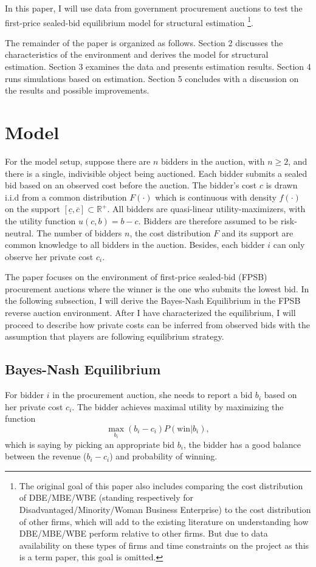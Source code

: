 \documentclass[11pt]{article}
\begin{document}
In this paper, I will use data from government procurement auctions to test 
the first-price sealed-bid equilibrium model \cite{RileySamuelson1981} 
for structural estimation
\footnote{The original goal of this paper also includes comparing the cost 
distribution of DBE/MBE/WBE (standing respectively for Disadvantaged/Minority/Woman
Business Enterprise) to the cost distribution of other firms, which will add 
to the existing literature on understanding how DBE/MBE/WBE perform relative 
to other firms. But due to data availability on these types of firms 
and time constraints on the project as this is a 
term paper, this goal is omitted. }.

The remainder of the paper is organized as follows. Section 2 discusses the 
characteristics of the environment and derives the model for structural 
estimation. Section 3 examines the data and presents estimation results. 
Section 4 runs simulations based on estimation. Section 5 concludes with 
a discussion on the results and possible improvements. 

\section{Model}

For the model setup, suppose there are $n$ bidders in the auction, with 
$n \geq 2$, and 
there is a single, indivisible object being auctioned. Each bidder submits 
a sealed bid based on an observed cost before the auction. The 
bidder's cost $c$ is drawn i.i.d from a common distribution $F(\cdot)$ which is 
continuous with density $f(\cdot)$ on the support $[\underline{c}, \overline{c}] \subset \mathbb{R}^{+}$. 
All bidders are quasi-linear utility-maximizers, with the utility function 
$u(c, b) = b - c$. Bidders are therefore assumed to be risk-neutral. 
The number of bidders $n$, the cost distribution $F$ and its support are common 
knowledge to all bidders in the auction. Besides, each bidder $i$ can only observe her 
private cost $c_i$. 

The paper focuses on the environment of first-price sealed-bid (FPSB) procurement 
auctions where the winner is the one who submits the 
lowest bid. In the following subsection, I will derive the 
Bayes-Nash Equilibrium in the FPSB reverse auction environment.
After I have characterized the equilibrium, I will proceed to describe how 
private costs can be inferred from observed bids with the assumption 
that players are following equilibrium strategy. 

\subsection{Bayes-Nash Equilibrium}
For bidder $i$ in the procurement auction, she needs to report a bid $b_i$ based on 
her private cost $c_i$. The bidder achieves maximal utility 
by maximizing the function 
$$ \max_{b_i} (b_i - c_i)P(\text{win}|b_i), $$ 
which is saying by picking an appropriate bid $b_i$, the bidder 
has a good balance between the revenue ($b_i - c_i$) and probability of winning. 
\end{document}
